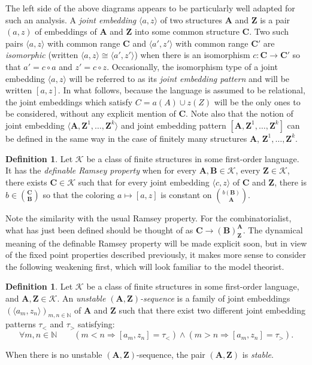 \documentclass[11pt]{article}
\theoremstyle{definition}
\newtheorem{defi}[theo]{Definition}
\numberwithin{equation}{section}
\numberwithin{figure}{section}
\numberwithin{table}{section}
\newcommand{\N}{\mathbb{N}}
\newcommand{\K}{\mathcal{K}}
\newcommand*{\mA}{\mathbf{A}}
\newcommand*{\mB}{\mathbf{B}}
\newcommand*{\mC}{\mathbf{C}}
\newcommand*{\mZ}{\mathbf{Z}}
\let\oldforall\forall
\renewcommand*{\forall}{\mathrel{\oldforall}}
\begin{document}
The left side of the above diagrams appears to be particularly well adapted for such an analysis. A \emph{joint embedding} $\langle a,z\rangle$ of two structures $\mA$ and $\mZ$ is a pair $(a,z)$ of embeddings of $\mA$ and $\mZ$ into some common structure $\mC$. Two such pairs $\langle a,z\rangle$ with common range $\mC$ and $\langle a',z'\rangle$ with common range $\mC'$ are \emph{isomorphic} (written $\langle a,z\rangle \cong \langle a',z'\rangle$) when there is an isomorphism $c:\mC\rightarrow \mC'$ so that $a'=c\circ a$ and $z'=c\circ z$. Occasionally, the isomorphism type of a joint embedding $\langle a,z\rangle$ will be referred to as its \emph{joint embedding pattern} and will be written $[a,z]$. In what follows, because the language is assumed to be relational, the joint embeddings which satisfy $C=a(A)\cup z(Z)$ will be the only ones to be considered, without any explicit mention of $\mC$. Note also that the notion of joint embedding $\langle \mA, \mZ^{1},\ldots,\mZ^{k}\rangle$ and joint embedding pattern $[\mA, \mZ^{1},\ldots,\mZ^{k}]$ can be defined in the same way in the case of finitely many structures $\mA$, $\mZ^{1},\ldots,\mZ^{k}$.

\begin{defi}
Let $\K$ be a class of finite structures in some first-order language. It has the \emph{definable Ramsey property} when for every $\mA, \mB\in \K$, every $\mZ\in \K$, there exists $\mC \in \K$ such that for every joint embedding $\langle c,z\rangle$ of $\mC$ and $\mZ$, there is $b\in \binom{\mC}{\mB}$ so that the coloring $a\mapsto [a,z]$ is constant on $\binom{b(\mB)}{\mA}$.
\end{defi}

Note the similarity with the usual Ramsey property. For the combinatorialist, what has just been defined should be thought of as $\mC \rightarrow (\mB)^{\mA}_{\mZ}$. The dynamical meaning of the definable Ramsey property will be made explicit soon, but in view of the fixed point properties described previously, it makes more sense to consider the following weakening first, which will look familiar to the model theorist.

\begin{defi}
Let $\K$ be a class of finite structures in some first-order language, and $\mA, \mZ\in \K$. An \emph{unstable $(\mA,\mZ)$-sequence} is a family of joint embeddings $(\langle a_{m}, z_{n}\rangle)_{m, n\in\N}$ of $\mA$ and $\mZ$ such that there exist two different joint embedding patterns $\tau_{<}$ and $\tau_{>}$ satisfying:
\[
\forall m,n\in \N \qquad (m<n \Rightarrow [a_{m},z_{n}] = \tau_{<})\wedge (m>n \Rightarrow [a_{m},z_{n}] = \tau_{>}).
\]

When there is no unstable $(\mA, \mZ)$-sequence, the pair $(\mA, \mZ)$ is \emph{stable}.
\end{defi}
\end{document}
